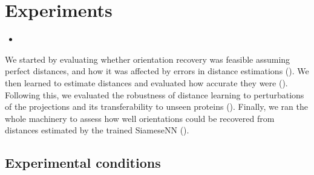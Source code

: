 \section{Experiments}\label{sec:experiments}

\begin{itemize}
    \item {}
\end{itemize}

We started by evaluating whether orientation recovery  was feasible assuming perfect distances, and how it was affected by errors in distance estimations ().
We then learned to estimate distances  and evaluated how accurate they were ().
Following this, we evaluated the robustness of distance learning to perturbations of the projections and its transferability to unseen proteins ().
Finally, we ran the whole machinery to assess how well orientations could be recovered from distances estimated by the trained SiameseNN ().


\subsection{Experimental conditions}\label{sec:results:data}

